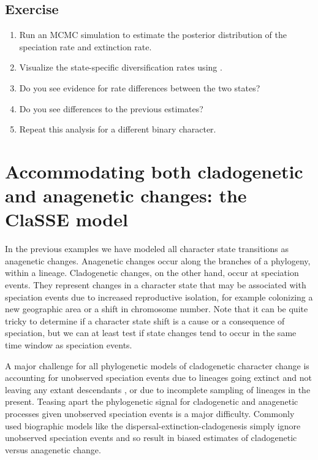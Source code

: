 


\subsection{Exercise}

\begin{enumerate}
\item Run an MCMC simulation to estimate the posterior distribution of the speciation rate and extinction rate.
\item Visualize the state-specific diversification rates using \R.
\item Do you see evidence for rate differences between the two states?
\item Do you see differences to the previous \BiSSE estimates?
\item Repeat this analysis for a different binary character.
\end{enumerate}


\newpage
\section{Accommodating both cladogenetic and anagenetic changes: the ClaSSE model}\label{sec:ClaSSE}

In the previous examples we have modeled all character state transitions
as anagenetic changes.
Anagenetic changes occur along the branches of a phylogeny, within a lineage.
Cladogenetic changes, on the other hand, occur at speciation events.
They represent changes in a character state that may be associated with speciation events
due to increased reproductive isolation,
for example colonizing a new geographic area or a shift in chromosome number.
Note that it can be quite tricky to determine if a character state shift is a cause or a consequence of speciation, but we can at least test if state changes tend to occur in the same time window as speciation events.

A major challenge for all phylogenetic models of cladogenetic character change
is accounting
for unobserved speciation events due to lineages going extinct
and not leaving any extant descendants \citep{Bokma2002},
or due to incomplete sampling of lineages in the present.
Teasing apart
the phylogenetic signal for cladogenetic and anagenetic processes given
unobserved speciation events is a major difficulty.
Commonly used biographic models like the
dispersal-extinction-cladogenesis \citep[DEC;][]{Ree2008} simply ignore
unobserved speciation events and so result in biased
estimates of cladogenetic versus anagenetic change.

